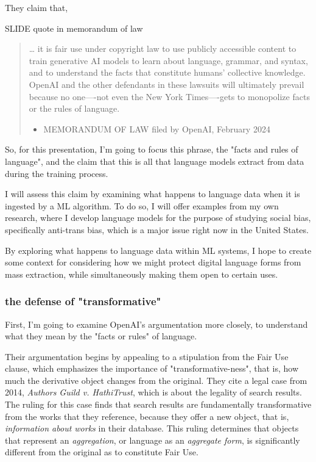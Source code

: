 \documentclass[11pt]{article}
\begin{document}
They claim that,

SLIDE quote in memorandum of law

\begin{quote}
\ldots{} it is fair use under copyright law to use publicly accessible
content to train generative AI models to learn about language,
grammar, and syntax, and to understand the facts that constitute
humans’ collective knowledge. OpenAI and the other defendants in these
lawsuits will ultimately prevail because no one—-not even the New York
Times—-gets to monopolize facts or the rules of language.

\begin{itemize}
\item MEMORANDUM OF LAW filed by OpenAI, February 2024
\end{itemize}
\end{quote}

So, for this presentation, I'm going to focus this phrase, the "facts
and rules of language", and the claim that this is all that language
models extract from data during the training process.

I will assess this claim by examining what happens to language data
when it is ingested by a ML algorithm. To do so, I will offer examples
from my own research, where I develop language models for the purpose
of studying social bias, specifically anti-trans bias, which is a
major issue right now in the United States.

By exploring what happens to language data within ML systems, I hope
to create some context for considering how we might protect digital
language forms from mass extraction, while simultaneously making them
open to certain uses.

\subsubsection{the defense of "transformative"}
\label{sec:orga2610b1}
First, I'm going to examine OpenAI's argumentation more closely, to
understand what they mean by the "facts or rules" of language.

Their argumentation begins by appealing to a stipulation from the Fair
Use clause, which emphasizes the importance of "transformative-ness",
that is, how much the derivative object changes from the original.
They cite a legal case from 2014, \emph{Authors Guild v. HathiTrust}, which
is about the legality of search results. The ruling for this case
finds that search results are fundamentally transformative from the
works that they reference, because they offer a new object, that is,
\emph{information about works} in their database. This ruling determines
that objects that represent an \emph{aggregation}, or language as an
\emph{aggregate form}, is significantly different from the original as to
constitute Fair Use.
\end{document}
